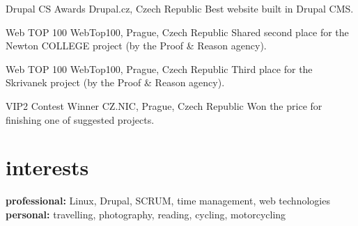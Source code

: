 \documentclass[]{friggeri-cv} %
\begin{document}
    \begin{entrylist}
        \entry
        {\parbox[t]{2cm}{}}
        {Drupal CS Awards}
        {Drupal.cz, Czech Republic}
        {Best website built in Drupal CMS.}
        \entry
        {\parbox[t]{2cm}{}}
        {Web TOP 100}
        {WebTop100, Prague, Czech Republic}
        {Shared second place for the Newton COLLEGE project (by the Proof \& Reason agency).}
        \entry
        {\parbox[t]{2cm}{}}
        {Web TOP 100}
        {WebTop100, Prague, Czech Republic}
        {Third place for the Skrivanek project (by the Proof \& Reason agency).}
        \entry
        {\parbox[t]{2cm}{}}
        {VIP2 Contest Winner}
        {CZ.NIC, Prague, Czech Republic}
        {Won the price for finishing one of suggested projects.}
    \end{entrylist}



    \section{interests}

    \textbf{professional:} Linux, Drupal, SCRUM, time management, web technologies \\
    \textbf{personal:} travelling, photography, reading, cycling, motorcycling
\end{document}
